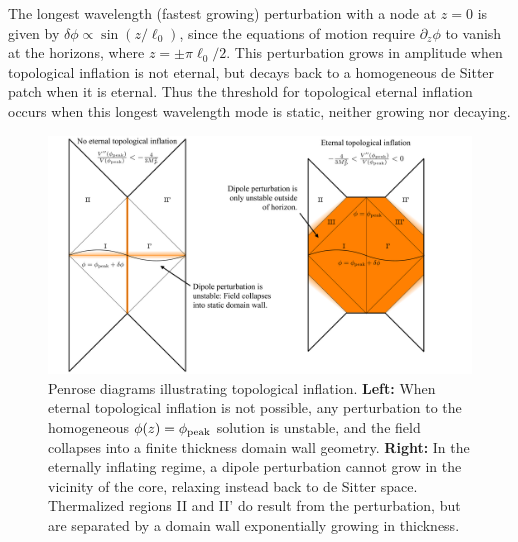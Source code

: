 \documentclass[aps,amsfonts,amsmath,prd,preprint,nofootinbib,superscriptaddress]{revtex4}
\begin{document}
\begin{appendix}
The longest wavelength (fastest growing) perturbation with a
node at $z=0$ is given by $\delta\phi \propto \sin(z/\ell_0)$, since the equations of motion require $\partial_z\phi$ to vanish at the horizons, where $z = \pm \pi \ell_0/2$.
This perturbation grows in amplitude when topological inflation is not eternal, but decays back to a homogeneous de Sitter patch when it is eternal.
Thus the threshold for topological eternal inflation occurs when this longest wavelength mode is static, neither growing nor decaying.


\begin{figure}[htbp]
\begin{center}
\includegraphics[width=1\textwidth]{figures/TEI}
\caption{Penrose diagrams illustrating topological inflation.  {\bf Left:} When eternal topological inflation is not possible, any perturbation to the homogeneous $\phi(z) = \phi_{\rm peak}$ solution is unstable, and the field collapses into a finite thickness domain wall geometry.
{\bf Right:}  In the eternally inflating regime, a dipole perturbation cannot grow in the vicinity of the core, relaxing instead back to de Sitter space.  Thermalized regions II and II' do result from the perturbation, but are separated by a domain wall exponentially growing in thickness.}
\label{fig:TEI}
\end{center}
\end{figure}





\end{appendix}
\end{document}
